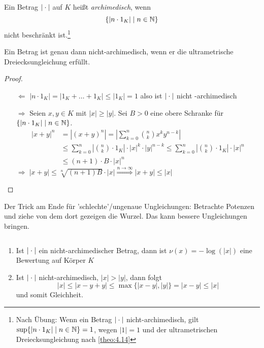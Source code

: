 \documentclass[../main.tex]{subfiles}
\begin{document}
\begin{definition}
    Ein Betrag $|\cdot|$ auf $K$ heißt \emph{archimedisch}, wenn 
    $$\{|n\cdot1_K| \mid n\in \mathbb{N}\}$$
    nicht beschränkt ist.\footnote{Nach Übung: Wenn ein Betrag $|\cdot|$ nicht-archimedisch, gilt $\sup\{|n\cdot1_K| \mid n\in \mathbb{N}\} = 1$, wegen $|1| = 1$ und der ultrametrischen Dreiecksungleichung nach \ref{theo:4.14}}
\end{definition}

\begin{theorem}\label{theo:4.14}
    Ein Betrag ist genau dann nicht-archimedisch, wenn er die ultrametrische Dreiecksungleichung erfüllt.
\end{theorem}
\begin{proof}
    \begin{itemize}
        \item[$\Leftarrow$]
        $|n\cdot 1_K|= |1_K+\dots+1_K| \leq |1_K| = 1$ also ist $|\cdot|$ nicht -archimedisch
        \item[$\Rightarrow$]
        Seien $x,y\in K$ mit \obda $|x|\geq|y|$.
        Sei $B>0$ eine obere Schranke für $\{|n\cdot1_K| \mid n\in \mathbb{N}\}$.
        \begin{align*}
            |x+y|^n &= |(x+y)^n| = |\sum_{k=0}^n \binom{n}{k} x^k y^{n-k}|\\
            &\leq \sum_{k=0}^n |\binom{n}{k}\cdot 1_K| \cdot |x|^k \cdot |y|^{n-k} \leq \sum_{k=0}^n |\binom{n}{k}\cdot 1_K| \cdot |x|^n\\
            &\leq (n+1)\cdot B\cdot |x|^n
        \end{align*}
        $\Longrightarrow\;|x+y| \leq \sqrt[n]{(n+1)B} \cdot |x| \overset{n\rightarrow \infty}{\Rightarrow} |x+y| \leq |x|$
    \end{itemize}
\end{proof}
Der Trick am Ende für 'schlechte'/ungenaue Ungleichungen:
Betrachte Potenzen und ziehe von dem dort gezeigen die Wurzel. Das kann bessere Ungleichungen bringen.
\begin{remark}$ $
    \begin{enumerate}[label=\alph*)]
        \item Ist $|\cdot|$ ein nicht-archimedischer Betrag, dann ist $\nu(x) = -\log(|x|)$ eine Bewertung auf Körper $K$
        \item Ist $|\cdot|$ nicht-archimedisch, $|x|> |y|$, dann folgt 
        $$|x|\leq |x-y+y|\leq \max\{|x-y|,|y|\} = |x-y| \leq |x|$$
        und somit Gleichheit.
    \end{enumerate}
\end{remark}
\end{document}
